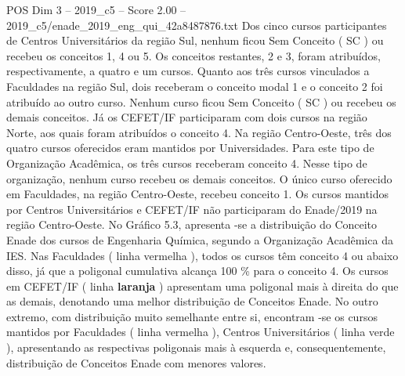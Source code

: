 \begin{textsample}{POS Dim 3 – 2019\_c5 – Score 2.00 – 2019\_c5/enade\_2019\_eng\_qui\_42a8487876.txt}
Dos cinco cursos participantes de Centros Universitários da região Sul, nenhum ficou Sem Conceito ( SC ) ou recebeu os conceitos 1, 4 ou 5.
Os conceitos restantes, 2 e 3, foram atribuídos, respectivamente, a quatro e um cursos.
Quanto aos três cursos vinculados a Faculdades na região Sul, dois receberam o conceito modal 1 e o conceito 2 foi atribuído ao outro curso.
Nenhum curso ficou Sem Conceito ( SC ) ou recebeu os demais conceitos.
Já os CEFET/IF participaram com dois cursos na região Norte, aos quais foram atribuídos o conceito 4.
Na região Centro-Oeste, três dos quatro cursos oferecidos eram mantidos por Universidades.
Para este tipo de Organização Acadêmica, os três cursos receberam conceito 4.
Nesse tipo de organização, nenhum curso recebeu os demais conceitos.
O único curso oferecido em Faculdades, na região Centro-Oeste, recebeu conceito 1.
Os cursos mantidos por Centros Universitários e CEFET/IF não participaram do Enade/2019 na região Centro-Oeste.
No Gráfico 5.3, apresenta -se a distribuição do Conceito Enade dos cursos de Engenharia Química, segundo a Organização Acadêmica da IES.
Nas Faculdades ( linha vermelha ), todos os cursos têm conceito 4 ou abaixo disso, já que a poligonal cumulativa alcança 100 \% para o conceito 4.
Os cursos em CEFET/IF ( linha \textbf{laranja} ) apresentam uma poligonal mais à direita do que as demais, denotando uma melhor distribuição de Conceitos Enade.
No outro extremo, com distribuição muito semelhante entre si, encontram -se os cursos mantidos por Faculdades ( linha vermelha ), Centros Universitários ( linha verde ), apresentando as respectivas poligonais mais à esquerda e, consequentemente, distribuição de Conceitos Enade com menores valores.

\end{textsample}
